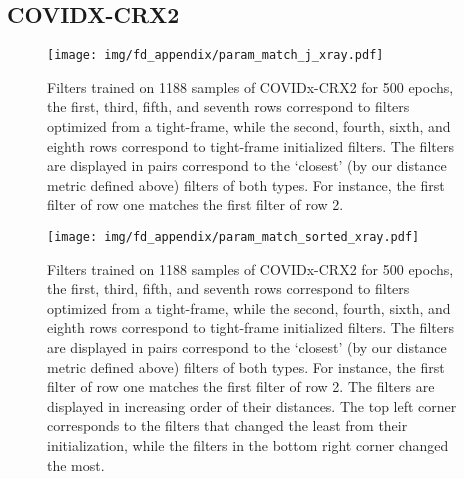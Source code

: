 \documentclass[10pt,twocolumn,letterpaper]{article}
\begin{document}
\begin{table*}[t]
\subsection{COVIDX-CRX2}
\begin{figure}[H]
    \centering
    \texttt{[image: img/fd\_appendix/param\_match\_j\_xray.pdf]}
    \vspace{-50pt}
    \caption{Filters trained on 1188 samples of COVIDx-CRX2 for 500 epochs, the first, third, fifth, and seventh rows correspond to filters optimized from a tight-frame, while the second, fourth, sixth, and eighth rows correspond to tight-frame initialized filters. The filters are displayed in pairs correspond to the `closest' (by our distance metric defined above) filters of both types. For instance, the first filter of row one matches the first filter of row 2.}
    \label{fig:covidj}
\end{figure}
\clearpage
\begin{figure}[H]
    \centering
    \texttt{[image: img/fd\_appendix/param\_match\_sorted\_xray.pdf]}
    \vspace{-50pt}
    \caption{Filters trained on 1188 samples of COVIDx-CRX2 for 500 epochs, the first, third, fifth, and seventh rows correspond to filters optimized from a tight-frame, while the second, fourth, sixth, and eighth rows correspond to tight-frame initialized filters. The filters are displayed in pairs correspond to the `closest' (by our distance metric defined above) filters of both types. For instance, the first filter of row one matches the first filter of row 2. The filters are displayed in increasing order of their distances. The top left corner corresponds to the filters that changed the least from their initialization, while the filters in the bottom right corner changed the most.}
    \label{fig:covidsorted}
\end{figure}

\clearpage

\end{table*}
\end{document}
